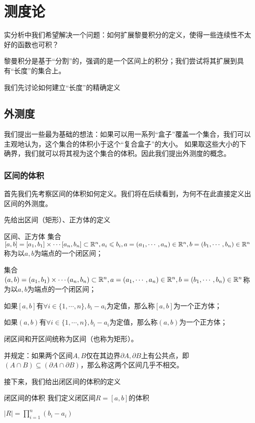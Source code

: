 \documentclass[12pt, a4paper, oneside, UTF8]{ctexbook}
\begin{document}
% 
\else
\fi
\chapter{测度论}
	实分析中我们希望解决一个问题：如何扩展黎曼积分的定义，使得一些连续性不太好的函数也可积？
	
	黎曼积分是基于“分割”的，强调的是一个区间上的积分；我们尝试将其扩展到具有“长度”的集合上。
	
	我们先讨论如何建立“长度”的精确定义
	\section{外测度}
	我们提出一些最为基础的想法：如果可以用一系列“盒子”覆盖一个集合，我们可以主观地认为，这个集合的体积小于这个“复合盒子”的大小。
	如果取这些大小的下确界，我们就可以将其视为这个集合的体积。因此我们提出外测度的概念。
		\subsection{区间的体积}
		首先我们先考察区间的体积如何定义。我们将在后续看到，为何不在此直接定义出区间的外测度。
		
		先给出区间（矩形）、正方体的定义
		\begin{defn}{区间、正方体}{}
			集合$[a,b]=[a_1,b_1] \times \cdots [a_n,b_n] \subset \mathbb{R}^n,a_i \leqslant b_i,a=(a_1,\cdots,a_n)\in\mathbb{R}^n,b=(b_1,\cdots,b_n)\in\mathbb{R}^n$称为以$a,b$为端点的一个闭区间；
			
			集合$(a,b)=(a_1,b_1) \times \cdots (a_n,b_n) \subset \mathbb{R}^n,a=(a_1,\cdots,a_n)\in\mathbb{R}^n,b=(b_1,\cdots,b_n)\in\mathbb{R}^n$称为以$a,b$为端点的一个闭区间；
			
			如果$[a,b]$有$\forall i \in \{1,\cdots,n\},b_i-a_i$为定值，那么称$[a,b]$为一个正方体；
			
			如果$(a,b)$有$\forall i \in \{1,\cdots,n\},b_i-a_i$为定值，那么称$(a,b)$为一个正方体；
			
			闭区间和开区间统称为区间（也称为矩形）。
			
			并规定：如果两个区间$A,B$仅在其边界$\partial A,\partial B$上有公共点，即$(A \cap B )\subseteq (\partial A \cap \partial B)$，那么称这两个区间几乎不相交。
		\end{defn}
		接下来，我们给出闭区间的体积的定义
		\begin{defn}{闭区间的体积}
			我们定义闭区间$R = [a,b]$的体积
			
			$|R| = \prod\limits_{i=1}^{n} (b_i-a_i)$
		\end{defn}
\end{document}
